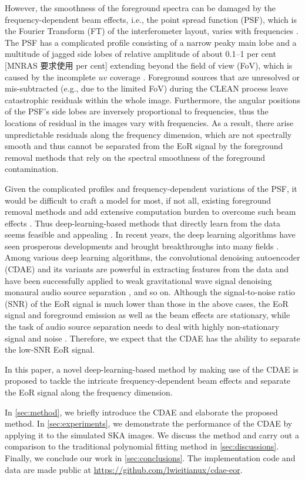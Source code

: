 \documentclass[letters,a4paper,fleqn,usenatbib]{mnras}
\begin{document}
{\color{cyan}%
However, the smoothness of the foreground spectra can be damaged by
the frequency-dependent beam effects, i.e., the point spread function
(PSF), which is the Fourier Transform (FT) of the interferometer layout,
varies with frequencies \citep{liu2009ps}.
The PSF has a complicated profile consisting of a narrow peaky main lobe
and a multitude of jagged side lobes of relative amplitude of about
\numrange{0.1}{1} per cent [MNRAS 要求使用 per cent] extending beyond the field of view (FoV),
which is caused by the incomplete $uv$ coverage
\citep[e.g.,][figures 1 and 3]{liu2009ps}.
Foreground sources that are unresolved or mis-subtracted (e.g., due to
the limited FoV) during the CLEAN process leave catastrophic residuals
within the whole image.
Furthermore, the angular positions of the PSF's side lobes are inversely
proportional to frequencies,
thus the locations of residual in the images vary with frequencies.
As a result, there arise unpredictable residuals along the frequency
dimension, which are not spectrally smooth and thus cannot be separated
from the EoR signal by the foreground removal methods that rely on the
spectral smoothness of the foreground contamination.

Given the complicated profiles and frequency-dependent variations of
the PSF, it would be difficult to craft a model for most, if not all,
existing foreground removal methods and add extensive computation burden
to overcome such beam effects \citep[e.g.,][]{lochner2015,vafaeiSadr2018}.
Thus deep-learning-based methods that directly learn from the data
seems feasible and appealing \citep[e.g.,][]{herbel2018,vafaeiSadr2018}.
In recent years, the deep learning algorithms have seen prosperous
developments and brought breakthroughs into many fields
\citep[see][for a recent review]{lecun2015}.
Among various deep learning algorithms, the convolutional denoising
autoencoder (CDAE) and its variants are powerful in extracting features
from the data and have been successfully applied to
weak gravitational wave signal denoising \citep{shen2017}
monaural audio source separation \citep{grais2017}, and so on.
Although the signal-to-noise ratio (SNR) of the EoR signal is much
lower than those in the above cases, the EoR signal and foreground
emission as well as the beam effects are stationary, while the task of
audio source separation needs to deal with highly non-stationary signal
and noise \citep{grais2017}.
Therefore, we expect that the CDAE has the ability to separate the
low-SNR EoR signal.

In this paper, a novel deep-learning-based method by making use of the
CDAE is proposed to tackle the intricate frequency-dependent beam effects
and separate the EoR signal along the frequency dimension.} %
In \autoref{sec:method}, we briefly introduce the CDAE and elaborate
the proposed method.
In \autoref{sec:experiments}, we demonstrate the performance of the
CDAE by applying it to the simulated SKA images.
We discuss the method and carry out a comparison to the traditional
polynomial fitting method in \autoref{sec:discussions}.
Finally, we conclude our work in \autoref{sec:conclusions}.
The implementation code and data are made public at
\url{https://github.com/lwieitianux/cdae-eor}.
\end{document}
